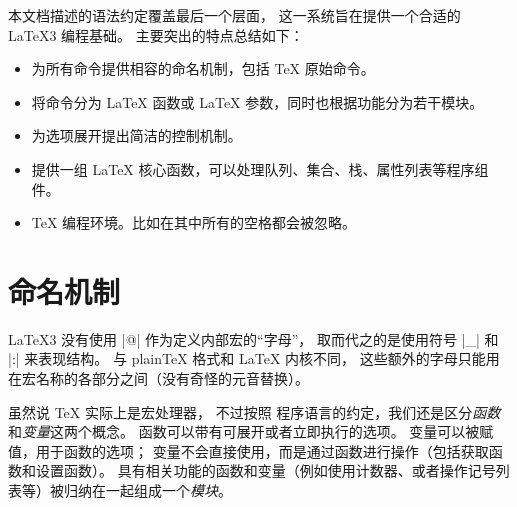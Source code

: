\documentclass[full]{l3doc}
\begin{document}
本文档描述的语法约定覆盖最后一个层面，
这一系统旨在提供一个合适的 \LaTeX3 编程基础。
主要突出的特点总结如下：
\begin{itemize}
\item 为所有命令提供相容的命名机制，包括 \TeX{} 原始命令。
\item 将命令分为 \LaTeX{} 函数或 \LaTeX{} 参数，同时也根据功能分为若干模块。
\item 为选项展开提出简洁的控制机制。
\item 提供一组 \LaTeX{} 核心函数，可以处理队列、集合、栈、属性列表等程序组件。
\item \TeX{} 编程环境。比如在其中所有的空格都会被忽略。
\end{itemize}

%
\section{命名机制}
%

\LaTeX3 没有使用 |@| 作为定义内部宏的“字母”，
取而代之的是使用符号 |_| 和 |:| 来表现结构。
与 plain\TeX{} 格式和 \LaTeX{} 内核不同，
这些额外的字母只能用在宏名称的各部分之间（没有奇怪的元音替换）。

%
%
虽然说 \TeX{} 实际上是宏处理器，
不过按照  程序语言的约定，我们还是区分\emph{函数}和\emph{变量}这两个概念。
函数可以带有可展开或者立即执行的选项。
变量可以被赋值，用于函数的选项；
变量不会直接使用，而是通过函数进行操作（包括获取函数和设置函数）。
具有相关功能的函数和变量（例如使用计数器、或者操作记号列表等）被归纳在一起组成一个\emph{模块}。
\end{document}
